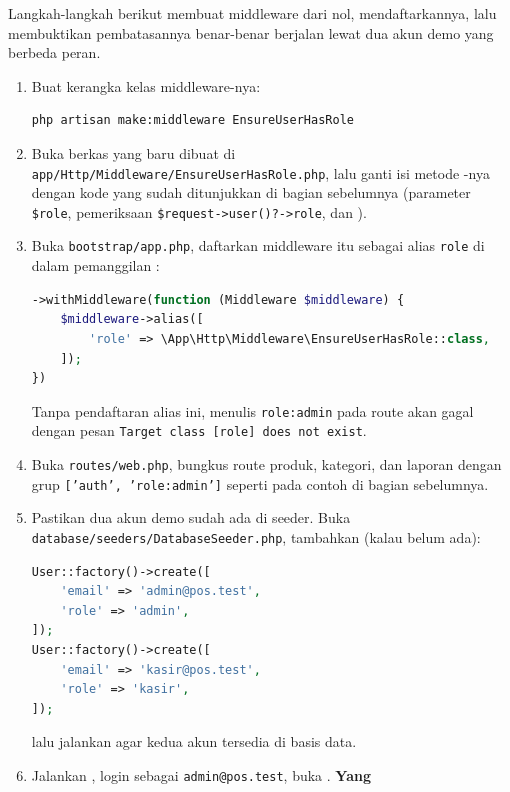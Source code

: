 Langkah-langkah berikut membuat middleware 
dari nol, mendaftarkannya, lalu membuktikan pembatasannya benar-benar
berjalan lewat dua akun demo yang berbeda peran.

\begin{enumerate}
  \item Buat kerangka kelas middleware-nya:
    \begin{lstlisting}[language=bash]
php artisan make:middleware EnsureUserHasRole
    \end{lstlisting}
  \item Buka berkas yang baru dibuat di
    \texttt{app/Http\allowbreak/Middleware\allowbreak/EnsureUserHasRole.php}, lalu ganti isi
    metode -nya dengan kode yang sudah ditunjukkan di
    bagian sebelumnya (parameter \texttt{\$role}, pemeriksaan
    \texttt{\$request->user()?->role}, dan ).
  \item Buka \texttt{bootstrap/app.php}, daftarkan middleware itu sebagai
    alias \texttt{role} di dalam pemanggilan :
    \begin{lstlisting}[language=php, title=\lstfile{bootstrap/app.php}]
->withMiddleware(function (Middleware $middleware) {
    $middleware->alias([
        'role' => \App\Http\Middleware\EnsureUserHasRole::class,
    ]);
})
    \end{lstlisting}
    Tanpa pendaftaran alias ini, menulis \texttt{role:admin} pada route
    akan gagal dengan pesan \texttt{Target class [role] does not exist}.
  \item Buka \texttt{routes/web.php}, bungkus route produk, kategori, dan
    laporan dengan grup \texttt{['auth', 'role:admin']} seperti pada
    contoh di bagian sebelumnya.
  \item Pastikan dua akun demo sudah ada di seeder. Buka
    \texttt{database/seeders/DatabaseSeeder.php}, tambahkan (kalau belum
    ada):
    \begin{lstlisting}[language=php, title=\lstfile{database/seeders/DatabaseSeeder.php}]
User::factory()->create([
    'email' => 'admin@pos.test',
    'role' => 'admin',
]);
User::factory()->create([
    'email' => 'kasir@pos.test',
    'role' => 'kasir',
]);
    \end{lstlisting}
    lalu jalankan  agar kedua
    akun tersedia di basis data.
  \item Jalankan , login sebagai
    \texttt{admin@pos.test}, buka . \textbf{Yang
}
\end{enumerate}
